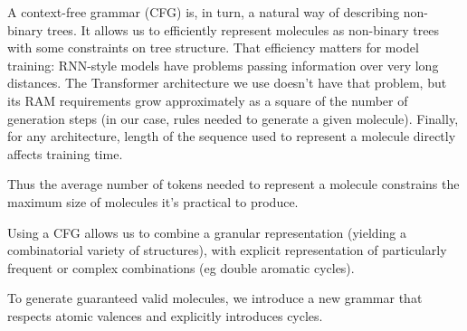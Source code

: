 \documentclass{article}
\begin{document}
A context-free grammar (CFG) is, in turn, a natural way of describing non-binary trees. 
%
It allows us to efficiently represent molecules as non-binary trees with some constraints on tree structure. That efficiency matters for model training: RNN-style models have problems passing information over very long distances. The Transformer architecture we use doesn't have that problem, but its RAM requirements grow approximately as a square of the number of generation steps (in our case, rules needed to generate a given molecule). Finally, for any architecture, length of the sequence used to represent a molecule directly affects training time. 

Thus the average number of tokens needed to represent a molecule constrains the maximum size of molecules it's practical to produce.

Using a CFG allows us to combine a granular representation (yielding a combinatorial variety of structures), with explicit representation of particularly frequent or complex combinations (eg double aromatic cycles).

To generate guaranteed valid molecules, we introduce a new grammar that respects atomic valences and explicitly introduces cycles.
\end{document}
